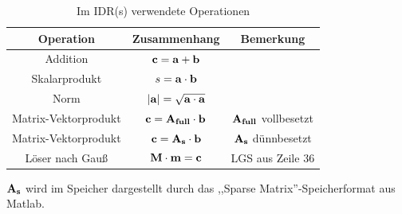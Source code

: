 \documentclass[journal]{IEEEtran}
\begin{document}
\begin{table}[h]
\renewcommand{\arraystretch}{1.3}
\caption{Im IDR(s) verwendete Operationen}
\label{idrsops}
\centering
\begin{tabular}{|c||c||c|}
\hline
\bfseries Operation & \bfseries Zusammenhang & \bfseries Bemerkung \\
\hline\hline


  Addition & $ \bf{c} = \bf{a} + \bf{b}$ & \\
  \hline
  Skalarprodukt & $ s = \bf{a} \cdot \bf{b}$ & \\
  \hline
  Norm & $ |\bf{a}|= \sqrt{ \bf{a} \cdot \bf{a}}$ & \\
  \hline
  Matrix-Vektorprodukt & $ \bf{c}= \bf{A}_{full} \cdot {b} $ & $\bf{A_{full}}$ vollbesetzt\\
  \hline

  Matrix-Vektorprodukt & $   \bf{c} = \bf{A}_{s} \cdot \bf{b} $ & $\bf{A_{s}}$  dünnbesetzt \\
  \hline

  Löser nach Gauß & $  \bf{M} \cdot \bf{m} = \bf{c} $ &LGS aus Zeile 36 \cite{idrsm} \\

\hline
\end{tabular}
\end{table}

$\bf{A_{s}}$ wird im Speicher dargestellt durch das ,,Sparse Matrix''-Speicherformat
aus Matlab. \cite{matlabsparse}

%
%
%
\end{document}
